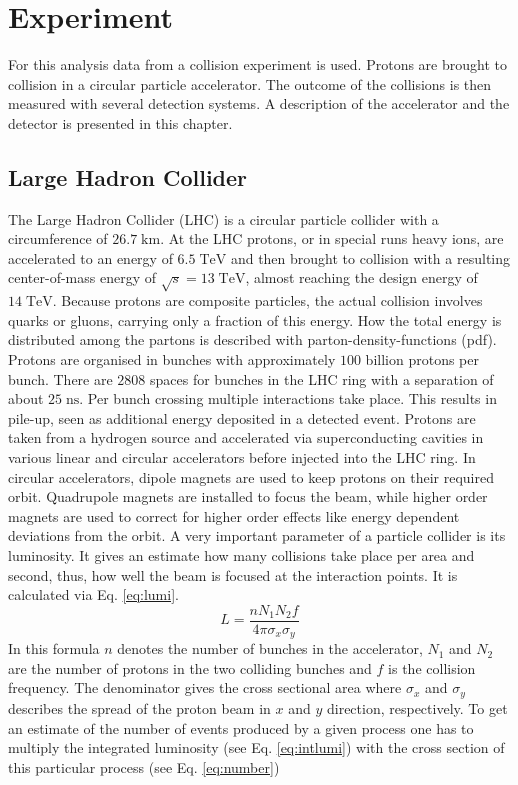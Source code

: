 \chapter{Experiment}
	For this analysis data from a collision experiment is used. Protons are brought to collision in a circular particle accelerator. The outcome of the collisions is then measured with several detection systems. A description of the accelerator and the detector is presented in this chapter.
\section{Large Hadron Collider}
	The Large Hadron Collider (LHC) is a circular particle collider with a circumference of $26.7\;\text{km}$. At the LHC protons, or in special runs heavy ions, are accelerated to an energy of $6.5\;\text{TeV}$ and then brought to collision with a resulting center-of-mass energy of $\sqrt{s}=13\;\text{TeV}$, almost reaching the design energy of $14\;\text{TeV}$. Because protons are composite particles, the actual collision involves quarks or gluons, carrying only a fraction of this energy. How the total energy is distributed among the partons is described with parton-density-functions (pdf). Protons are organised in bunches with approximately $100$ billion protons per bunch. There are $2808$ spaces for bunches in the LHC ring with a separation of about $25\;\text{ns}$. Per bunch crossing multiple interactions take place. This results in pile-up, seen as additional energy deposited in a detected event.	Protons are taken from a hydrogen source and accelerated via superconducting cavities in various linear and circular accelerators before injected into the LHC ring. In circular accelerators, dipole magnets are used to keep protons on their required orbit. Quadrupole magnets are installed to focus the beam, while higher order magnets are used to correct for higher order effects like energy dependent deviations from the orbit. A very important parameter of a particle collider is its luminosity. It gives an estimate how many collisions take place per area and second, thus, how well the beam is focused at the interaction points. It is calculated via Eq. \ref{eq:lumi}. 
	\begin{equation}
	L = \frac{n N_1 N_2 f}{4 \pi \sigma_x \sigma_y}
	\label{eq:lumi}
	\end{equation} 
	In this formula $n$ denotes the number of bunches in the accelerator, $N_1$ and $N_2$ are the number of protons in the two colliding bunches and $f$ is the collision frequency. The denominator gives the cross sectional area where $\sigma_x$ and $\sigma_y$ describes the spread of the proton beam in $x$ and $y$ direction, respectively. To get an estimate of the number of events produced by a given process one has to multiply the integrated luminosity (see Eq. \ref{eq:intlumi}) with the cross section of this particular process (see Eq. \ref{eq:number})
